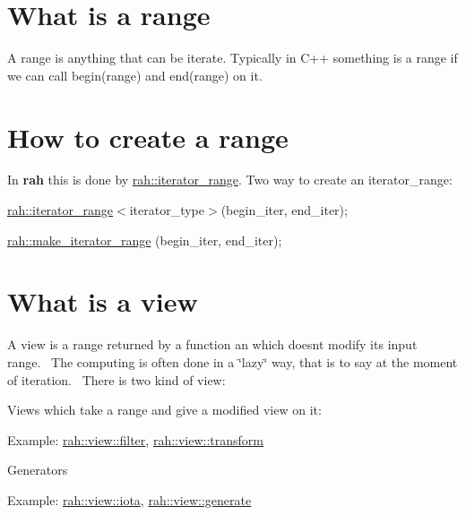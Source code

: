 \section*{What is a range}

A range is anything that can be iterate. Typically in C++ something is a range if we can call {\ttfamily begin(range)} and {\ttfamily end(range)} on it.

\section*{How to create a range}

In {\bfseries{rah}} this is done by {\ttfamily \mbox{\hyperlink{structrah_1_1iterator__range}{rah\+::iterator\+\_\+range}}}. Two way to create an iterator\+\_\+range\+:
\begin{DoxyItemize}
\item {\ttfamily \mbox{\hyperlink{structrah_1_1iterator__range}{rah\+::iterator\+\_\+range}}$<$iterator\+\_\+type$>$(begin\+\_\+iter, end\+\_\+iter);}
\item {\ttfamily \mbox{\hyperlink{namespacerah_a4e145bfeb8a932058e20fc4cb4e7c206}{rah\+::make\+\_\+iterator\+\_\+range}} (begin\+\_\+iter, end\+\_\+iter);}
\end{DoxyItemize}

\section*{What is a view}

A view is a range returned by a function an which doesn\textquotesingle{}t modify it\textquotesingle{}s input range.~\newline
 The computing is often done in a \char`\"{}lazy\char`\"{} way, that is to say at the moment of iteration.~\newline
 There is two kind of view\+:
\begin{DoxyItemize}
\item Views which take a range and give a modified view on it\+:
\begin{DoxyItemize}
\item Example\+: {\ttfamily \mbox{\hyperlink{namespacerah_1_1view_a69010369aadc2a36ee9517195f783e9a}{rah\+::view\+::filter}}}, {\ttfamily \mbox{\hyperlink{namespacerah_1_1view_a73d98aff6def51242231b9ec440dd026}{rah\+::view\+::transform}}}
\end{DoxyItemize}
\item Generators
\begin{DoxyItemize}
\item Example\+: {\ttfamily \mbox{\hyperlink{namespacerah_1_1view_aa5f05009b0c914331b0e5dbe62656b5a}{rah\+::view\+::iota}}}, {\ttfamily \mbox{\hyperlink{namespacerah_1_1view_a05a3de164c8d1fde6ca761119d90a789}{rah\+::view\+::generate}}}
\end{DoxyItemize}
\end{DoxyItemize}

